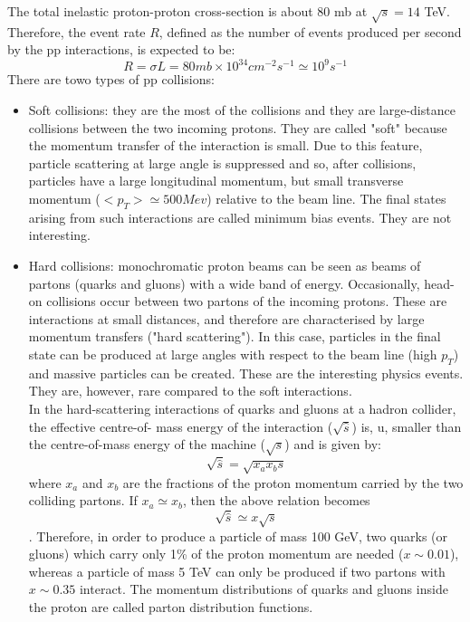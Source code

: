 \documentclass[a4paper, oneside]{book}
\begin{document}
			The total inelastic proton-proton cross-section is about 80 mb at $\sqrt{s} = 14$ TeV. \cite{LHC introduction} Therefore, the event rate $R$, defined as the number of events produced per second by the pp interactions, is expected to be:
			$$
			R = \sigma L = 80 mb\times10^{34}cm^{-2}s^{-1} \simeq 10^{9}s^{-1}
			$$
			There are towo types of pp collisions:
			\begin{itemize}
				\item Soft collisions: 
				they are the most of the collisions and they are large-distance collisions between the two incoming protons. They are called "soft" because the momentum transfer of the interaction is small. Due to this feature, particle scattering at large angle is suppressed and so, after collisions, particles have a large longitudinal momentum, but small transverse momentum ($<p_T>\simeq500 Mev$) relative to the beam line. The final states
				arising from such interactions are called minimum bias events. They are not interesting.
				\item Hard collisions:
				monochromatic proton beams can be seen as beams of partons (quarks and gluons) with a wide band
				of energy. Occasionally, head-on collisions occur between two partons of the incoming protons. These are interactions at small distances, and therefore are characterised by large
				momentum transfers ("hard scattering"). In this case, particles in the final state can be produced at large angles with respect to the beam line (high $p_T$) and massive particles can be created.
				These are the interesting physics events. They are, however, rare compared to the soft interactions. \\
				In the hard-scattering interactions of quarks and gluons at a hadron collider, the effective centre-of-
				mass energy of the interaction ($\sqrt{\hat{s}}$) is, u, smaller than the centre-of-mass energy of the machine ($\sqrt{s}$) and is given by: 
				$$ 
				\sqrt{\hat{s}} = \sqrt{x_ax_bs}
				$$
				where $x_a$ and $x_b$ are the fractions of the proton momentum carried by the two colliding partons. If $x_a \simeq x_b$, then the above relation becomes
				$$ 
				\sqrt{\hat{s}} \simeq x\sqrt{s}
				$$.
				Therefore, in order to produce a particle of mass 100 GeV, two quarks (or gluons) which carry only 1\% of the proton momentum are needed ($x \sim 0.01$), whereas a particle of mass 5 TeV can only be produced if two partons with $x \sim 0.35$ interact. The momentum distributions of quarks and gluons inside the proton are called parton distribution functions. \cite{LHC introduction}
			\end{itemize}
\end{document}
